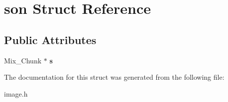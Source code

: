 \hypertarget{structson}{}\section{son Struct Reference}
\label{structson}
\subsection*{Public Attributes}
\begin{DoxyCompactItemize}
\item 
\mbox{\label{structson_af496cd73d10f1704714e21f3b7630a13}} 
Mix\+\_\+\+Chunk $\ast$ {\bfseries s}
\end{DoxyCompactItemize}


The documentation for this struct was generated from the following file\+:\begin{DoxyCompactItemize}
\item 
image.\+h\end{DoxyCompactItemize}
